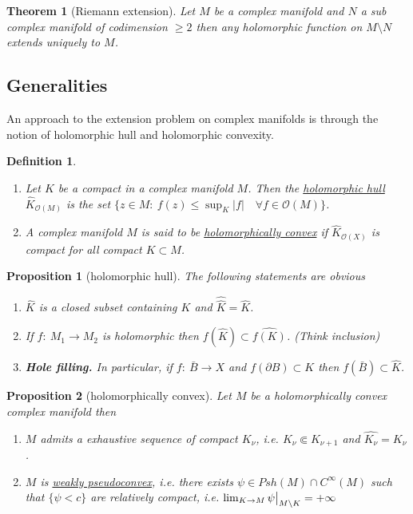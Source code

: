 \documentclass[11pt]{article}
\newtheorem{theorem}{Theorem}
\newtheorem{proposition}{Proposition}[theorem]
\newtheorem{definition}{Definition}
\newcommand\restr[2]{{%
\left.\kern-\nulldelimiterspace %
#1 %
\vphantom{\big|} %
\right|_{#2} %
}}
\begin{document}
\begin{theorem}[Riemann extension]
\label{thm:riemann-ext}
Let \(M\) be a complex manifold and \(N\) a sub complex manifold of codimension \(\geq 2\) then any holomorphic function on \(M\setminus N\) extends uniquely to \(M\).
\end{theorem}

\subsection{Generalities}
\label{sec:orgc573705}
An approach to the extension problem on complex manifolds is through the notion of holomorphic hull and holomorphic convexity.

\begin{definition}
\begin{enumerate}
\item Let \(K\) be a compact in a complex manifold \(M\). Then the \uline{holomorphic hull} \(\hat K_{\mathcal{O}(M)}\) is the set \(\{ z\in M:\ f(z) \leq \sup_K |f| \quad\forall
  f\in \mathcal{O}(M) \}\).
\item A complex manifold \(M\) is said to be \uline{holomorphically convex} if \(\hat
   K_{\mathcal{O}(X)}\) is compact for all compact \(K\subset M\).
\end{enumerate}
\end{definition}


\begin{proposition}[holomorphic hull]
\label{prop:holo-hull}
The following statements are obvious
\begin{enumerate}
\item \(\hat K\) is a closed subset containing \(K\) and \(\hat{\hat K} = \hat K\).
\item If \(f:\ M_1 \longrightarrow  M_2\) is holomorphic then \(f(\hat K)\subset
   \widehat{f(K)}\). \emph{(Think inclusion)}
\item \textbf{Hole filling.} In particular, if \(f:\ \bar B \longrightarrow X\) and \(f(\partial
   B) \subset K\) then \(f(\bar B)\subset \hat K\).
\end{enumerate}
\end{proposition}

\begin{proposition}[holomorphically convex]
\label{prop:holo-convex}
Let \(M\) be a holomorphically convex complex manifold then
\begin{enumerate}
\item \(M\) admits a exhaustive sequence of compact \(K_\nu\), i.e. \(K_\nu \Subset
   K_{\nu+1}\) and \(\widehat {K_\nu} = K_\nu\).
\item \(M\) is \uline{weakly pseudoconvex}, i.e. there exists \(\psi\in Psh(M)\cap C^\infty(M)\) such that \(\{\psi<c\}\) are relatively compact, i.e. \(\lim_{K\to M}
   \restr{\psi}{M\setminus K} = +\infty\)
\end{enumerate}
\end{proposition}
\end{document}
